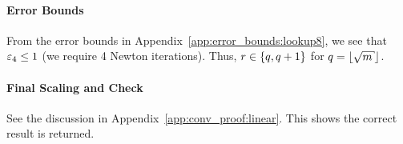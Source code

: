 \paragraph{Error Bounds}
From the error bounds in Appendix~\ref{app:error_bounds:lookup8},
we see that $\varepsilon_{4}\le1$ (we require 4 Newton iterations).
Thus, $r\in\left\{ q,q+1 \right\}$ for $q = \floor{\sqrt{m}}$.

\paragraph{Final Scaling and Check}
See the discussion in Appendix~\ref{app:conv_proof:linear}.
This shows the correct result is returned.
